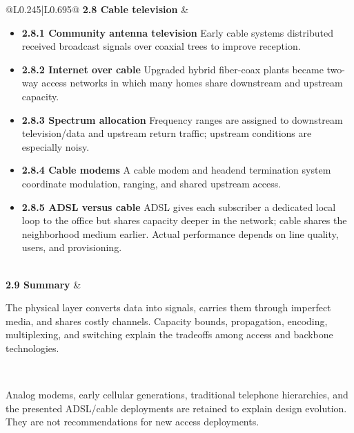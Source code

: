 \documentclass[10pt,letterpaper]{article}
\begin{document}
\begin{longtable}{@{}L{0.245\textwidth}|L{0.695\textwidth}@{}}
\textbf{2.8 Cable television} & \begin{minipage}[t]{\linewidth}\raggedright \begin{itemize}\item \textbf{2.8.1 Community antenna television} Early cable systems distributed received broadcast signals over coaxial trees to improve reception.\item \textbf{2.8.2 Internet over cable} Upgraded hybrid fiber-coax plants became two-way access networks in which many homes share downstream and upstream capacity.\item \textbf{2.8.3 Spectrum allocation} Frequency ranges are assigned to downstream television/data and upstream return traffic; upstream conditions are especially noisy.\item \textbf{2.8.4 Cable modems} A cable modem and headend termination system coordinate modulation, ranging, and shared upstream access.\item \textbf{2.8.5 ADSL versus cable} ADSL gives each subscriber a dedicated local loop to the office but shares capacity deeper in the network; cable shares the neighborhood medium earlier. Actual performance depends on line quality, users, and provisioning.\end{itemize}\end{minipage} \\ \hline
{}\textbf{2.9 Summary} & \begin{minipage}[t]{\linewidth}\raggedright The physical layer converts data into signals, carries them through imperfect media, and shares costly channels. Capacity bounds, propagation, encoding, multiplexing, and switching explain the tradeoffs among access and backbone technologies.\end{minipage} \\ \hline
\end{longtable}

\begin{legacybox}Analog modems, early cellular generations, traditional telephone hierarchies, and the presented ADSL/cable deployments are retained to explain design evolution. They are not recommendations for new access deployments.\end{legacybox}

\end{document}
